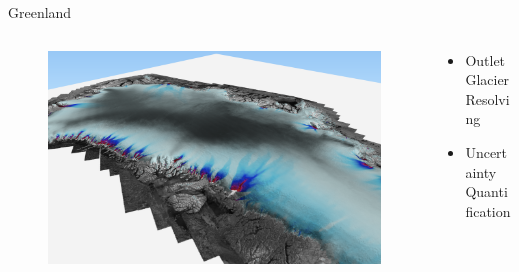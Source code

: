 \documentclass[hide notes,intlimits]{beamer}
\begin{document}
\begin{frame}{Greenland}
    \begin{columns}[c]
      \begin{column}{.45\linewidth}
        \begin{figure}
          \includegraphics[width=\textwidth]{gris-flow-3d}
        \end{figure}
      \end{column}
      \begin{column}{.55\linewidth}
        \begin{itemize}
        \item Outlet Glacier Resolving
        \item Uncertainty Quantification
        \end{itemize}
      \end{column}
    \end{columns}
\end{frame}
\end{document}
